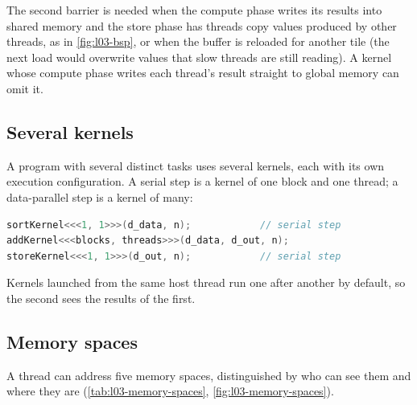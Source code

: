 \documentclass[../main.tex]{subfiles}
\begin{document}
The second barrier is needed when the compute phase writes its results
into shared memory and the store phase has threads copy values produced by
other threads, as in \cref{fig:l03-bsp}, or when the buffer is reloaded
for another tile (the next load would overwrite values that slow threads
are still reading).  A kernel whose compute phase writes each thread's
result straight to global memory can omit it.

\subsection{Several kernels}

A program with several distinct tasks uses several kernels, each with its
own execution configuration.  A serial step is a kernel of one block and
one thread; a data-parallel step is a kernel of many:
\begin{lstlisting}[language=C++, numbers=none]
sortKernel<<<1, 1>>>(d_data, n);            // serial step
addKernel<<<blocks, threads>>>(d_data, d_out, n);
storeKernel<<<1, 1>>>(d_out, n);            // serial step
\end{lstlisting}
Kernels launched from the same host thread run one after another by
default, so the second sees the results of the first.

\subsection{Memory spaces}

A thread can address five memory spaces, distinguished by who can see
them and where they are (\cref{tab:l03-memory-spaces},
\cref{fig:l03-memory-spaces}).
\end{document}
